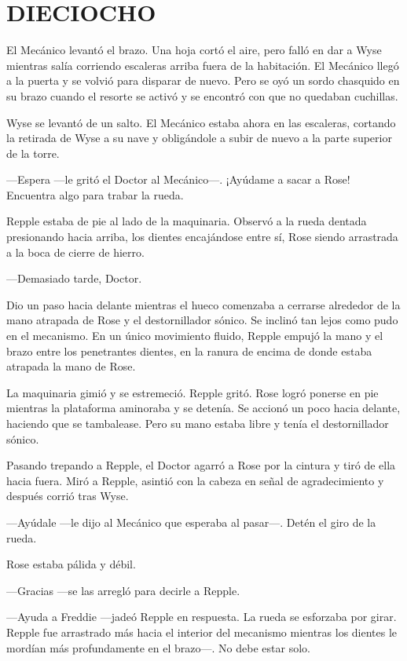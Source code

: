 \chapter*{DIECIOCHO}

{El Mecánico levantó el brazo. Una hoja cortó el aire, pero falló en dar
	a Wyse mientras salía corriendo escaleras arriba fuera de la habitación.
	El Mecánico llegó a la puerta y se volvió para disparar de nuevo. Pero
	se oyó un sordo chasquido en su brazo cuando el resorte se activó y se
encontró con que no quedaban cuchillas.}

{Wyse se levantó de un salto. El Mecánico estaba ahora en las escaleras,
	cortando la retirada de Wyse a su nave y obligándole a subir de nuevo a
la parte superior de la torre.}

{---Espera ---le gritó el Doctor al Mecánico---. ¡Ayúdame a sacar a
Rose! Encuentra algo para trabar la rueda.}

{Repple estaba de pie al lado de la maquinaria. Observó a la rueda
	dentada presionando hacia arriba, los dientes encajándose entre sí, Rose
siendo arrastrada a la boca de cierre de hierro.}

{---Demasiado tarde, Doctor.}

{Dio un paso hacia delante mientras el hueco comenzaba a cerrarse
	alrededor de la mano atrapada de Rose y el destornillador sónico. Se
	inclinó tan lejos como pudo en el mecanismo. En un único movimiento
	fluido, Repple empujó la mano y el brazo entre los penetrantes dientes,
en la ranura de encima de donde estaba atrapada la mano de Rose.}

{La maquinaria gimió y se estremeció. Repple gritó. Rose logró ponerse
	en pie mientras la plataforma aminoraba y se detenía. Se accionó un poco
	hacia delante, haciendo que se tambalease. Pero su mano estaba libre y
tenía el destornillador sónico.}

{Pasando trepando a Repple, el Doctor agarró a Rose por la cintura y
	tiró de ella hacia fuera. Miró a Repple, asintió con la cabeza en señal
de agradecimiento y después corrió tras Wyse.}

{---Ayúdale ---le dijo al Mecánico que esperaba al pasar---. Detén el
giro de la rueda.}

{Rose estaba pálida y débil.}

{---Gracias ---se las arregló para decirle a Repple.}

{---Ayuda a Freddie ---jadeó Repple en respuesta. La rueda se esforzaba
	por girar. Repple fue arrastrado más hacia el interior del mecanismo
	mientras los dientes le mordían más profundamente en el brazo---. No
debe estar solo.}

